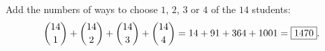 Add the numbers of ways to choose $1$, $2$, $3$ or $4$ of the $14$ students:
\[\dbinom{14}1+\dbinom{14}2+\dbinom{14}3+\dbinom{14}4=14+91+364+1001=\boxed{1470}.\]
